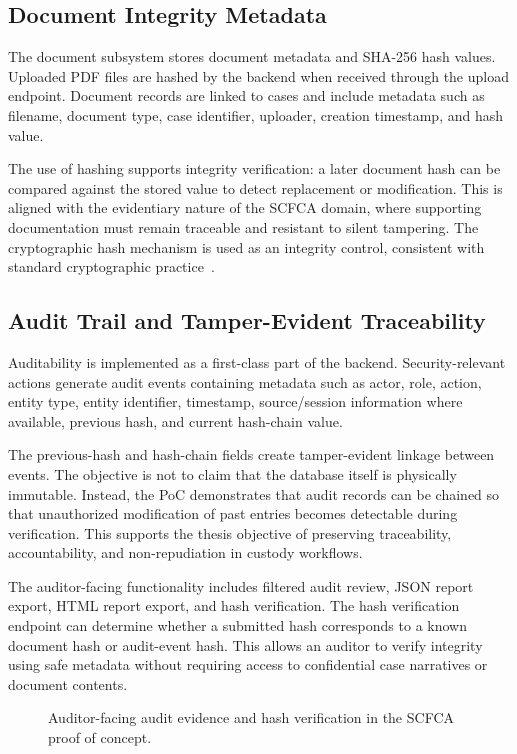 \documentclass[12pt,a4paper]{report}
\begin{document}
\subsection{Document Integrity Metadata}

The document subsystem stores document metadata and SHA-256 hash values. Uploaded PDF files are hashed by the backend when received through the upload endpoint. Document records are linked to cases and include metadata such as filename, document type, case identifier, uploader, creation timestamp, and hash value.

The use of hashing supports integrity verification: a later document hash can be compared against the stored value to detect replacement or modification. This is aligned with the evidentiary nature of the SCFCA domain, where supporting documentation must remain traceable and resistant to silent tampering. The cryptographic hash mechanism is used as an integrity control, consistent with standard cryptographic practice~\cite{Aumasson2021}.

\subsection{Audit Trail and Tamper-Evident Traceability}

Auditability is implemented as a first-class part of the backend. Security-relevant actions generate audit events containing metadata such as actor, role, action, entity type, entity identifier, timestamp, source/session information where available, previous hash, and current hash-chain value.

The previous-hash and hash-chain fields create tamper-evident linkage between events. The objective is not to claim that the database itself is physically immutable. Instead, the PoC demonstrates that audit records can be chained so that unauthorized modification of past entries becomes detectable during verification. This supports the thesis objective of preserving traceability, accountability, and non-repudiation in custody workflows.

The auditor-facing functionality includes filtered audit review, JSON report export, HTML report export, and hash verification. The hash verification endpoint can determine whether a submitted hash corresponds to a known document hash or audit-event hash. This allows an auditor to verify integrity using safe metadata without requiring access to confidential case narratives or document contents.

\begin{figure}[htbp]
    \centering
    \caption{Auditor-facing audit evidence and hash verification in the SCFCA proof of concept.}
    \label{fig:scfca-audit-evidence-placeholder}
\end{figure}
\end{document}

